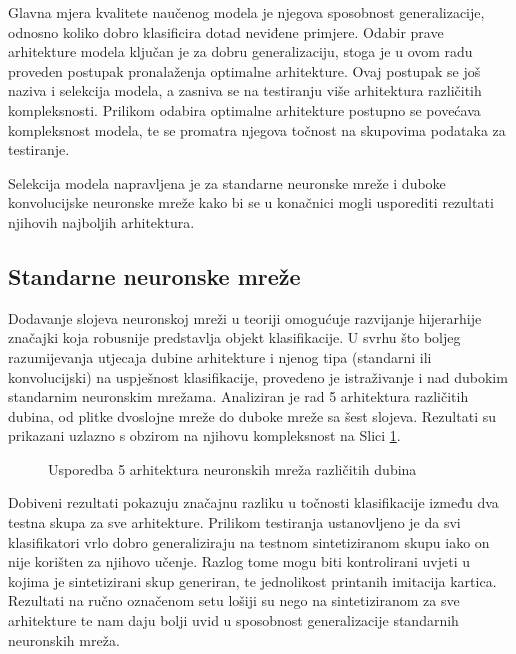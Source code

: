 \documentclass[lmodern, utf8, diplomski, numeric]{fer}
\begin{document}
Glavna mjera kvalitete naučenog modela je njegova sposobnost generalizacije, odnosno koliko dobro klasificira dotad neviđene primjere. Odabir prave arhitekture modela ključan je za dobru generalizaciju, stoga je u ovom radu proveden postupak pronalaženja optimalne arhitekture. Ovaj postupak se još naziva i selekcija modela, a zasniva se na testiranju više arhitektura različitih kompleksnosti. Prilikom odabira optimalne arhitekture postupno se povećava kompleksnost modela, te se promatra njegova točnost na skupovima podataka za testiranje. 

Selekcija modela napravljena je za standarne neuronske mreže i duboke konvolucijske neuronske mreže kako bi se u konačnici mogli usporediti rezultati njihovih najboljih arhitektura.

\subsection{Standarne neuronske mreže}

Dodavanje slojeva neuronskoj mreži u teoriji omogućuje razvijanje hijerarhije značajki koja robusnije predstavlja objekt klasifikacije. U svrhu što boljeg razumijevanja utjecaja dubine arhitekture i njenog tipa (standarni ili konvolucijski) na uspješnost klasifikacije,  provedeno je istraživanje i nad dubokim standarnim neuronskim mrežama. Analiziran je rad 5 arhitektura različitih dubina, od plitke dvoslojne mreže do duboke mreže sa šest slojeva. Rezultati su prikazani uzlazno s obzirom na njihovu kompleksnost na Slici \ref{graf:nncomplex}. 

\begin{figure}[ht!]
\begin{center}
    
    \caption{Usporedba 5 arhitektura neuronskih mreža različitih dubina}
\label{graf:nncomplex}
\end{center}
\end{figure}

Dobiveni rezultati pokazuju značajnu razliku u točnosti klasifikacije između dva testna skupa za sve arhitekture. Prilikom testiranja ustanovljeno je da svi klasifikatori vrlo dobro generaliziraju na testnom sintetiziranom skupu iako on nije korišten za njihovo učenje. Razlog tome mogu biti kontrolirani uvjeti u kojima je sintetizirani skup generiran, te jednolikost printanih imitacija kartica. Rezultati na ručno označenom setu lošiji su nego na sintetiziranom za sve arhitekture te nam daju bolji uvid u sposobnost generalizacije standarnih neuronskih mreža.
\end{document}

